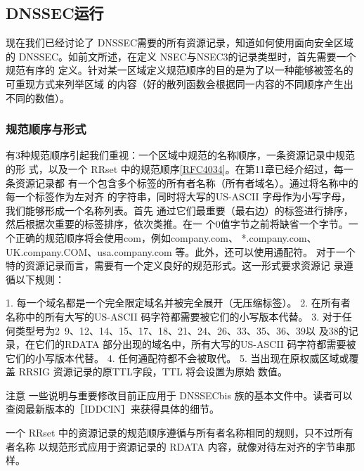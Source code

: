 \subsection{DNSSEC运行}
现在我们已经讨论了 DNSSEC需要的所有资源记录，知道如何使用面向安全区域的
DNSSEC。如前文所述，在定义 NSEC与NSEC3的记录类型时，首先需要一个规范有序的
定义。针对某一区域定义规范顺序的目的是为了以一种能够被签名的可重现方式来列举区域
的内容（好的散列函数会根据同一内容的不同顺序产生出不同的数值）。

\subsubsection{规范顺序与形式}
有3种规范顺序引起我们重视：一个区域中规范的名称顺序，一条资源记录中规范的形
式，以及一个 RRset 中的规范顺序\href{https://www.rfc-editor.org/rfc/rfc4034}{[RFC4034]}。在第11章已经介绍过，每一条资源记录都
有一个包含多个标签的所有者名称（所有者域名）。通过将名称中的每一个标签作为左对齐
的字符串，同时将大写的US-ASCII 字母作为小写字母，我们能够形成一个名称列表。首先
通过它们最重要（最右边）的标签进行排序，然后根据次重要的标签排序，依次类推。在一
个0值字节之前将缺省一个字节。一个正确的规范顺序将会使用com，例如company.com、
*.company.com、UK.company.COM、usa.company.com 等。此外，还可以使用通配符。
对于一个特的资源记录而言，需要有一个定义良好的规范形式。这一形式要求资源记
录遵循以下规则：

1. 每一个域名都是一个完全限定域名并被完全展开（无压缩标签）。
2. 在所有者名称中的所有大写的US-ASCII 码字符都需要被它们的小写版本代替。
3. 对于任何类型号为2~9、12、14、15、17、18、21、24、26、33、35、36、39以
及38的记录，在它们的RDATA 部分出现的域名中，所有大写的US-ASCII 码字符都需要被
它们的小写版本代替。
4. 任何通配符都不会被取代。
5. 当出现在原权威区域或覆盖 RRSIG 资源记录的原TTL字段，TTL 将会设置为原始
数值。

注意 一些说明与重要修改目前正应用于 DNSSECbis 族的基本文件中。读者可以
查阅最新版本的［IDDCIN］来获得具体的细节。

一个 RRset 中的资源记录的规范顺序遵循与所有者名称相同的规则，只不过所有者名称
以规范形式应用于资源记录的 RDATA 内容，就像对待左对齐的字节串那样。

